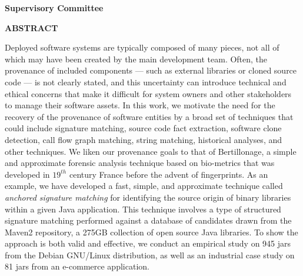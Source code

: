\newpage
{}

\noindent \textbf{Supervisory Committee}
\tpbreak
\panel

\begin{center}
\textbf{ABSTRACT}
\end{center}


Deployed software systems are typically composed of many pieces, not all of
which may have been created by the main development team.  Often, the
provenance of included components --- such as external libraries or cloned
source code --- is not clearly stated, and this uncertainty can introduce
technical and ethical concerns that make it difficult for system
owners and other stakeholders to manage their software assets.
In this work, we motivate
the need for the recovery of the provenance of software entities
by a broad
set of techniques that could include signature matching, source code fact
extraction, software clone detection, call flow graph matching, string
matching, historical analyses, and other techniques.
We liken our provenance goals to
that of Bertillonage, a simple and approximate forensic analysis technique
based on bio-metrics that was developed in $19^{th}$ century France before
the advent of fingerprints.  As an example, we have developed a fast,
simple, and approximate technique called \emph{anchored signature matching}
for identifying the source origin of binary libraries within a given Java
application.  This technique involves a type of structured signature
matching performed against a database of candidates drawn from the Maven2
repository, a 275GB collection of open source Java libraries.
To show the approach is both valid and effective, we conduct
an empirical study on 945 jars from the Debian GNU/Linux distribution,
as well as an industrial case study on 81 jars from an e-commerce
application.



%
%
%



